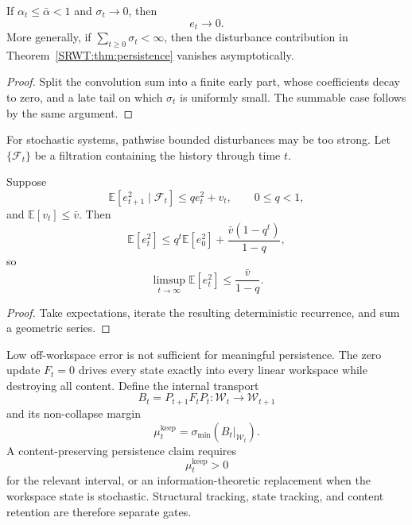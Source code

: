 \begin{SRWTcorollary}\label{SRWT:cor:vanishing-disturbance}
If \(\alpha_t\leq\bar\alpha<1\) and \(\sigma_t\to0\), then
\[
e_t\to0.
\]
More generally, if \(\sum_{t\geq0}\sigma_t<\infty\), then the disturbance
contribution in Theorem~\ref{SRWT:thm:persistence} vanishes asymptotically.
\end{SRWTcorollary}

\begin{proof}
Split the convolution sum into a finite early part, whose coefficients decay
to zero, and a late tail on which \(\sigma_t\) is uniformly small. The
summable case follows by the same argument.
\end{proof}


For stochastic systems, pathwise bounded disturbances may be too strong. Let
\(\{\mathcal F_t\}\) be a filtration containing the history through time
\(t\).

\begin{SRWTproposition}\label{SRWT:prop:mean-square-persistence}
Suppose
\[
\mathbb E[e_{t+1}^2\mid\mathcal F_t]
\leq
q e_t^2+v_t,
\qquad
0\leq q<1,
\]
and \(\mathbb E[v_t]\leq\bar v\). Then
\[
\boxed{
\mathbb E[e_t^2]
\leq
q^t\mathbb E[e_0^2]
+
\frac{\bar v(1-q^t)}{1-q},
}
\]
so
\[
\limsup_{t\to\infty}\mathbb E[e_t^2]
\leq
\frac{\bar v}{1-q}.
\]
\end{SRWTproposition}

\begin{proof}
Take expectations, iterate the resulting deterministic recurrence, and sum a
geometric series.
\end{proof}


Low off-workspace error is not sufficient for meaningful persistence. The
zero update \(F_t=0\) drives every state exactly into every linear workspace
while destroying all content. Define the internal transport
\[
B_t=P_{t+1}F_tP_t:\mathcal W_t\longrightarrow\mathcal W_{t+1}
\]
and its non-collapse margin
\[
\boxed{
\mu_t^{\mathrm{keep}}
=
\sigma_{\min}(B_t|_{\mathcal W_t}).
}
\]
A content-preserving persistence claim requires
\[
\mu_t^{\mathrm{keep}}>0
\]
for the relevant interval, or an information-theoretic replacement when the
workspace state is stochastic. Structural tracking, state tracking, and
content retention are therefore separate gates.

